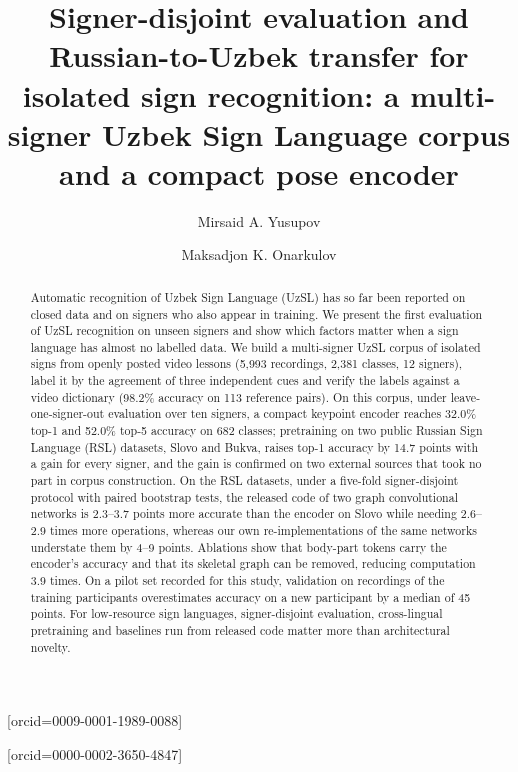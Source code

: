 \documentclass[a4paper,fleqn]{cas-dc}
\begin{document}
\let\WriteBookmarks\relax
\def\floatpagepagefraction{1}
\def\textpagefraction{.001}
\title[mode=title]{Signer-disjoint evaluation and Russian-to-Uzbek transfer for isolated sign recognition: a multi-signer Uzbek Sign Language corpus and a compact pose encoder}
\author[1]{Mirsaid A. Yusupov}[orcid=0009-0001-1989-0088]
\cormark[1]
\author[2]{Maksadjon K. Onarkulov}[orcid=0000-0002-3650-4847]
\begin{abstract}
Automatic recognition of Uzbek Sign Language (UzSL) has so far been reported on closed data and on signers who also appear in training. We present the first evaluation of UzSL recognition on unseen signers and show which factors matter when a sign language has almost no labelled data. We build a multi-signer UzSL corpus of isolated signs from openly posted video lessons (5,993 recordings, 2,381 classes, 12 signers), label it by the agreement of three independent cues and verify the labels against a video dictionary (98.2\% accuracy on 113 reference pairs). On this corpus, under leave-one-signer-out evaluation over ten signers, a compact keypoint encoder reaches 32.0\% top-1 and 52.0\% top-5 accuracy on 682 classes; pretraining on two public Russian Sign Language (RSL) datasets, Slovo and Bukva, raises top-1 accuracy by 14.7 points with a gain for every signer, and the gain is confirmed on two external sources that took no part in corpus construction. On the RSL datasets, under a five-fold signer-disjoint protocol with paired bootstrap tests, the released code of two graph convolutional networks is 2.3–3.7 points more accurate than the encoder on Slovo while needing 2.6–2.9 times more operations, whereas our own re-implementations of the same networks understate them by 4–9 points. Ablations show that body-part tokens carry the encoder's accuracy and that its skeletal graph can be removed, reducing computation 3.9 times. On a pilot set recorded for this study, validation on recordings of the training participants overestimates accuracy on a new participant by a median of 45 points. For low-resource sign languages, signer-disjoint evaluation, cross-lingual pretraining and baselines run from released code matter more than architectural novelty.
\end{abstract}
\end{document}
